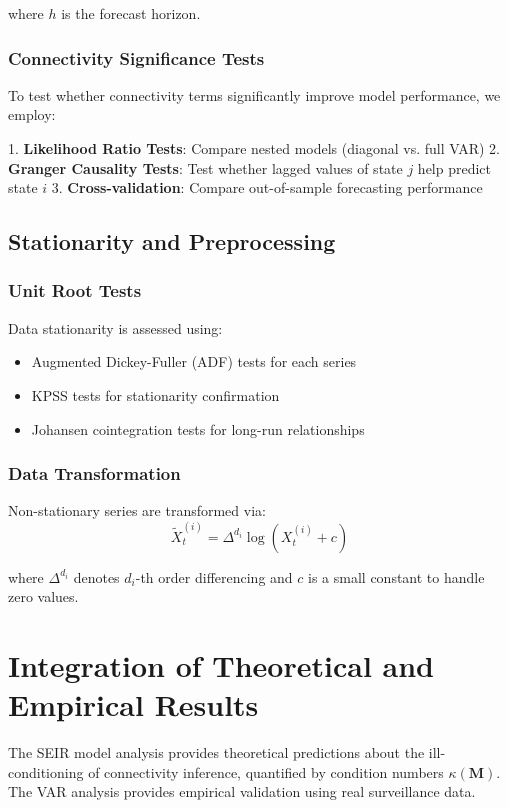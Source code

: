 where $h$ is the forecast horizon.

\subsubsection{Connectivity Significance Tests}
To test whether connectivity terms significantly improve model performance, we employ:

1. \textbf{Likelihood Ratio Tests}: Compare nested models (diagonal vs. full VAR)
2. \textbf{Granger Causality Tests}: Test whether lagged values of state $j$ help predict state $i$
3. \textbf{Cross-validation}: Compare out-of-sample forecasting performance

\subsection{Stationarity and Preprocessing}

\subsubsection{Unit Root Tests}
Data stationarity is assessed using:
\begin{itemize}
\item Augmented Dickey-Fuller (ADF) tests for each series
\item KPSS tests for stationarity confirmation
\item Johansen cointegration tests for long-run relationships
\end{itemize}

\subsubsection{Data Transformation}
Non-stationary series are transformed via:
\begin{equation}
\tilde{X}_t^{(i)} = \Delta^{d_i} \log(X_t^{(i)} + c) \label{eq:transform}
\end{equation}

where $\Delta^{d_i}$ denotes $d_i$-th order differencing and $c$ is a small constant to handle zero values.

\section{Integration of Theoretical and Empirical Results}

The SEIR model analysis provides theoretical predictions about the ill-conditioning of connectivity inference, quantified by condition numbers $\kappa(\mathbf{M})$. The VAR analysis provides empirical validation using real surveillance data.

